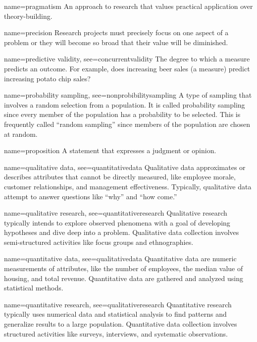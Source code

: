 {name={pragmatism}}
{%
	An approach to research that values practical application over theory-building. 
}

{name={precision}}
{%
	Research projects must precisely focus on one aspect of a problem or they will become so broad that their value will be diminished.
}

{name={predictive validity},
	see={concurrentvalidity}}
{%
	The degree to which a measure predicts an outcome. For example, does increasing beer sales (a measure) predict increasing potato chip sales?
}

{name={probability sampling},
	see={nonprobibilitysampling}}
{%
	A type of sampling that involves a random selection from a population. It is called probability sampling since every member of the population has a probability to be selected. This is frequently called ``random sampling'' since members of the population are chosen at random. 
}

{name={proposition}}
{%
	A statement that expresses a judgment or opinion.
}

{name={qualitative data},
	see={quantitativedata}}
{%
	Qualitative data approximates or describes attributes that cannot be directly measured, like employee morale, customer relationships, and management effectiveness. Typically, qualitative data attempt to answer questions like ``why'' and ``how come.'' 
}

{name={qualitative research},
	see={quantitativeresearch}}
{%
	Qualitative research typically intends to explore observed phenomena with a goal of developing hypotheses and dive deep into a problem. Qualitative data collection involves semi-structured activities like focus groups and ethnographies.
}

{name={quantitative data},
	see={qualitativedata}}
{%
	Quantitative data are numeric measurements of attributes, like the number of employees, the median value of housing, and total revenue. Quantitative data are gathered and analyzed using statistical methods.
}

{name={quantitative research},
	see={qualitativeresearch}}
{%
	Quantitative research typically uses numerical data and statistical analysis to find patterns and generalize results to a large population. Quantitative data collection involves structured activities like surveys, interviews, and systematic observations.
}

